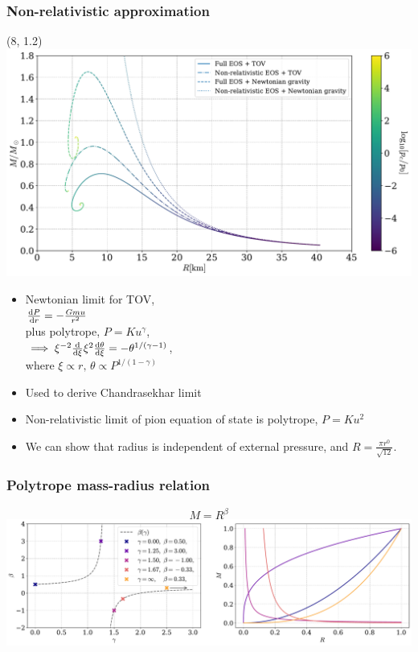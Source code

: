 \documentclass[aspectratio=169]{beamer}
\begin{document}
    \begin{frame}
        \frametitle{Non-relativistic approximation}

        \begin{textblock}{8}(8, 1.2)
            \includegraphics[width=\textwidth]{../../scripts/figurer/mass_radius_comparison.pdf}
        \end{textblock}

        \begin{itemize}
            \item Newtonian limit for TOV,\\
            $\odv{P}{r} = -\frac{G m u}{r^2}$\\
            plus polytrope, $P = K u^\gamma$,  \\
            $\implies \xi^{-2} \odv{}{\xi}\xi^2 \odv{\theta}{\xi} = -\theta^{1/(\gamma - 1)} $,\\
            where $\xi \propto r, \, \theta \propto P^{1/(1-\gamma)}$
            \item Used to derive Chandrasekhar limit
            \item Non-relativistic limit of pion equation of state is polytrope, $P = Ku^2$
            \item We can show that radius is independent of external pressure, and $R = \frac{\pi r^0}{\sqrt{12}}$.
        \end{itemize}

    \end{frame}


    \begin{frame}
        \frametitle{Polytrope mass-radius relation}
        $$M = R^{\beta}$$
        \includegraphics[width=\textwidth]{../../scripts/figurer/mass_radius_relation_polytropes.pdf}
    \end{frame}
\end{document}
